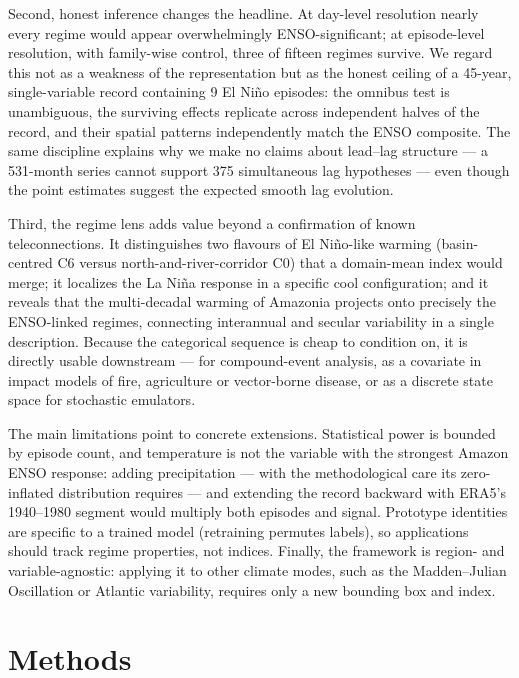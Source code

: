 \documentclass[pdflatex,sn-nature]{sn-jnl}
\begin{document}
Second, honest inference changes the headline. At day-level resolution nearly every regime would appear overwhelmingly ENSO-significant; at episode-level resolution, with family-wise control, three of fifteen regimes survive. We regard this not as a weakness of the representation but as the honest ceiling of a 45-year, single-variable record containing 9 El Ni\~no episodes: the omnibus test is unambiguous, the surviving effects replicate across independent halves of the record, and their spatial patterns independently match the ENSO composite. The same discipline explains why we make no claims about lead--lag structure --- a 531-month series cannot support 375 simultaneous lag hypotheses --- even though the point estimates suggest the expected smooth lag evolution.

Third, the regime lens adds value beyond a confirmation of known teleconnections. It distinguishes two flavours of El Ni\~no-like warming (basin-centred C6 versus north-and-river-corridor C0) that a domain-mean index would merge; it localizes the La Ni\~na response in a specific cool configuration; and it reveals that the multi-decadal warming of Amazonia projects onto precisely the ENSO-linked regimes, connecting interannual and secular variability in a single description. Because the categorical sequence is cheap to condition on, it is directly usable downstream --- for compound-event analysis, as a covariate in impact models of fire, agriculture or vector-borne disease\cite{tian2025dengue,Luiz_Silva_2024}, or as a discrete state space for stochastic emulators.

The main limitations point to concrete extensions. Statistical power is bounded by episode count, and temperature is not the variable with the strongest Amazon ENSO response: adding precipitation --- with the methodological care its zero-inflated distribution requires --- and extending the record backward with ERA5's 1940--1980 segment would multiply both episodes and signal. Prototype identities are specific to a trained model (retraining permutes labels), so applications should track regime properties, not indices. Finally, the framework is region- and variable-agnostic: applying it to other climate modes, such as the Madden--Julian Oscillation or Atlantic variability, requires only a new bounding box and index.

\section{Methods}\label{sec:methods}
\end{document}
